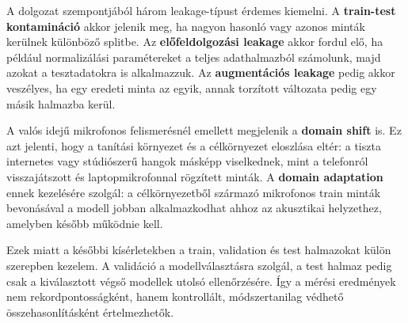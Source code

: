 A dolgozat szempontjából három leakage-típust érdemes kiemelni. A \textbf{train-test kontamináció} akkor jelenik meg, ha nagyon hasonló vagy azonos minták kerülnek különböző splitbe. Az \textbf{előfeldolgozási leakage} akkor fordul elő, ha például normalizálási paramétereket a teljes adathalmazból számolunk, majd azokat a tesztadatokra is alkalmazzuk. Az \textbf{augmentációs leakage} pedig akkor veszélyes, ha egy eredeti minta az egyik, annak torzított változata pedig egy másik halmazba kerül.

A valós idejű mikrofonos felismerésnél emellett megjelenik a \textbf{domain shift} is. Ez azt jelenti, hogy a tanítási környezet és a célkörnyezet eloszlása eltér: a tiszta internetes vagy stúdiószerű hangok másképp viselkednek, mint a telefonról visszajátszott és laptopmikrofonnal rögzített minták. A \textbf{domain adaptation} ennek kezelésére szolgál: a célkörnyezetből származó mikrofonos train minták bevonásával a modell jobban alkalmazkodhat ahhoz az akusztikai helyzethez, amelyben később működnie kell.

Ezek miatt a későbbi kísérletekben a train, validation és test halmazokat külön szerepben kezelem. A validáció a modellválasztásra szolgál, a test halmaz pedig csak a kiválasztott végső modellek utolsó ellenőrzésére. Így a mérési eredmények nem rekordpontosságként, hanem kontrollált, módszertanilag védhető összehasonlításként értelmezhetők.
